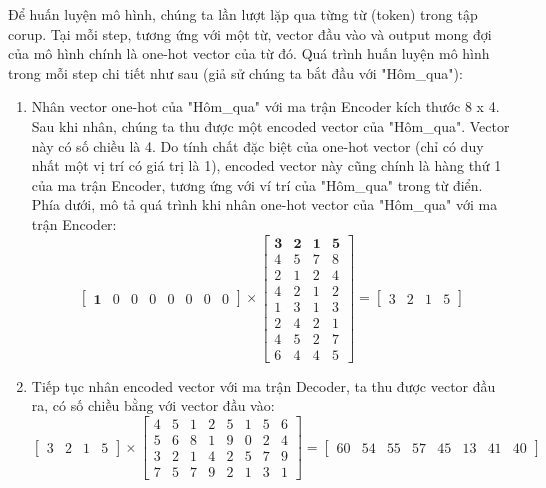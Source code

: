 Để huấn luyện mô hình, chúng ta lần lượt lặp qua từng từ (token) trong tập corup. Tại mỗi step, tương ứng với một từ, vector đầu vào và output mong đợi của mô hình chính là one-hot vector của từ đó. Quá trình huấn luyện mô hình trong mỗi step chi tiết như sau (giả sử chúng ta bắt đầu với "Hôm\_qua"):
\begin{enumerate}
    \item Nhân vector one-hot của "Hôm\_qua" với ma trận Encoder kích thước 8 x 4. Sau khi nhân, chúng ta thu được một encoded vector của "Hôm\_qua". Vector này có số chiều là 4. Do tính chất đặc biệt của one-hot vector (chỉ có duy nhất một vị trí có giá trị là 1), encoded vector này cũng chính là hàng thứ 1 của ma trận Encoder, tương ứng với ví trí của "Hôm\_qua" trong từ điển. Phía dưới, mô tả quá trình khi nhân one-hot vector của "Hôm\_qua" với ma trận Encoder:
    \begin{displaymath} 
        \begin{bmatrix}
        \boldsymbol{1} & 0 & 0 & 0 & 0 & 0 & 0 & 0
        \end{bmatrix} \times
        \begin{bmatrix}
         \boldsymbol{3} & \boldsymbol{2} & \boldsymbol{1} & \boldsymbol{5} \\
         4 & 5 & 7 & 8 \\
         2 & 1 & 2 & 4 \\
         4 & 2 & 1 & 2 \\
         1 & 3 & 1 & 3 \\
         2 & 4 & 2 & 1 \\
         4 & 5 & 2 & 7 \\
         6 & 4 & 4 & 5 
        \end{bmatrix} =
        \begin{bmatrix}
        3 & 2 & 1 & 5
        \end{bmatrix}
    \end{displaymath}
    
    \item Tiếp tục nhân encoded vector với ma trận Decoder, ta thu được vector đầu ra, có số chiều bằng với vector đầu vào:
    \begin{displaymath} 
        \begin{bmatrix}
        3 & 2 & 1 & 5
        \end{bmatrix} \times
        \begin{bmatrix}
        4 & 5 & 1 & 2 & 5 & 1 & 5 & 6 \\
        5 & 6 & 8 & 1 & 9 & 0 & 2 & 4 \\
        3 & 2 & 1 & 4 & 2 & 5 & 7 & 9 \\
        7 & 5 & 7 & 9 & 2 & 1 & 3 & 1
        \end{bmatrix} =
        \begin{bmatrix}
        60 & 54 & 55 & 57 & 45 & 13 & 41 & 40
        \end{bmatrix}
    \end{displaymath}
    

\end{enumerate}

